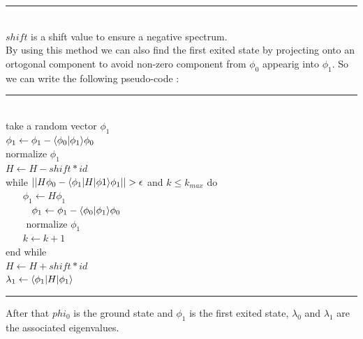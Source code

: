 \documentclass[1pt, a4paper]{article}
\begin{document}
\hrule
\noindent
\\
$shift$ is a shift value to ensure a negative spectrum.\\
By using this method we can also find the first exited state by projecting onto an ortogonal component to avoid non-zero component from $\phi_0$ appearig into $\phi_1$. So we can write the following pseudo-code :\\
\hrule
\noindent
\\
take a random vector $\phi_1$\\
$\phi_1 \leftarrow \phi_1 - \braket{\phi_0}{\phi_1}\phi_0$\\
normalize $\phi_1$\\
$H \leftarrow H - shift * id$\\
while $||H\phi_0 - \Braket{\phi_1}{H}{\phi 1}\phi_1|| > \epsilon$ and $k\leq k_{max}$ do\\
$~~~~~~~~ \phi_1 \leftarrow H\phi_1$\\
$~~~~~~~~\phi_1 \leftarrow \phi_1 - \braket{\phi_0}{\phi_1}\phi_0$\\
$~~~~~~~~$ normalize $\phi_1$\\
$~~~~~~~~ k \leftarrow k + 1$\\
end while\\
$H \leftarrow H + shift * id$\\
$\lambda_1 \leftarrow \Braket{\phi_1}{H}{\phi_1}$\\
\hrule
\noindent
\newpage\noindent
After that $phi_0$ is the ground state and $\phi_1$ is the first exited state, $\lambda_0$ and $\lambda_1$ are the associated eigenvalues.
\end{document}
